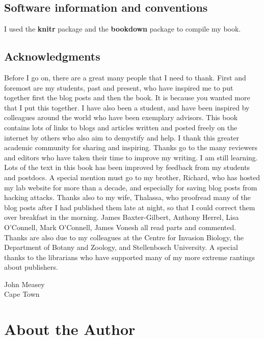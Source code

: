\documentclass[
]{krantz}
\begin{document}
\hypertarget{software-information-and-conventions}{%
\section*{Software information and conventions}\label{software-information-and-conventions}}


I used the \textbf{knitr} package \citep{xie2015dynamic} and the \textbf{bookdown} package \citep{R-bookdown} to compile my book.

\hypertarget{acknowledgments}{%
\section*{Acknowledgments}\label{acknowledgments}}


Before I go on, there are a great many people that I need to thank. First and foremost are my students, past and present, who have inspired me to put together first the blog posts and then the book. It is because you wanted more that I put this together. I have also been a student, and have been inspired by colleagues around the world who have been exemplary advisors. This book contains lots of links to blogs and articles written and posted freely on the internet by others who also aim to demystify and help. I thank this greater academic community for sharing and inspiring. Thanks go to the many reviewers and editors who have taken their time to improve my writing. I am still learning. Lots of the text in this book has been improved by feedback from my students and postdocs. A special mention must go to my brother, Richard, who has hosted my lab website for more than a decade, and especially for saving blog posts from hacking attacks. Thanks also to my wife, Thalassa, who proofread many of the blog posts after I had published them late at night, so that I could correct them over breakfast in the morning. James Baxter-Gilbert, Anthony Herrel, Lisa O'Connell, Mark O'Connell, James Vonesh all read parts and commented. Thanks are also due to my colleagues at the Centre for Invasion Biology, the Department of Botany and Zoology, and Stellenbosch University. A special thanks to the librarians who have supported many of my more extreme rantings about publishers.

\begin{flushright}
John Measey\\
Cape Town
\end{flushright}

\hypertarget{author}{%
\chapter*{About the Author}\label{author}}
\end{document}
